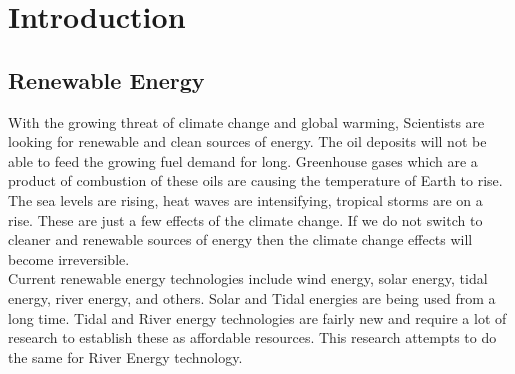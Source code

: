 
\chapter{Introduction} %

\label{Chapter1} %


\newcommand{\keyword}[1]{\textbf{#1}}
\newcommand{\tabhead}[1]{\textbf{#1}}
\newcommand{\code}[1]{\texttt{#1}}
\newcommand{\file}[1]{\texttt{\bfseries#1}}
\newcommand{\option}[1]{\texttt{\itshape#1}}


\section{Renewable Energy}
With the growing threat of climate change and global warming, Scientists are looking for renewable and clean sources of energy. The oil deposits will not be able to feed the growing fuel demand for long. Greenhouse gases which are a product of combustion of these oils are causing the temperature of Earth to rise. The sea levels are rising, heat waves are intensifying, tropical storms are on a rise. These are just a few effects of the climate change. If we do not switch to cleaner and renewable sources of energy then the climate change effects will become irreversible. \\
Current renewable energy technologies include wind energy, solar energy, tidal energy, river energy, and others. Solar and Tidal energies are being used from a long time. Tidal and River energy technologies are fairly new and require a lot of research to establish these as affordable resources. This research attempts to do the same for River Energy technology.

